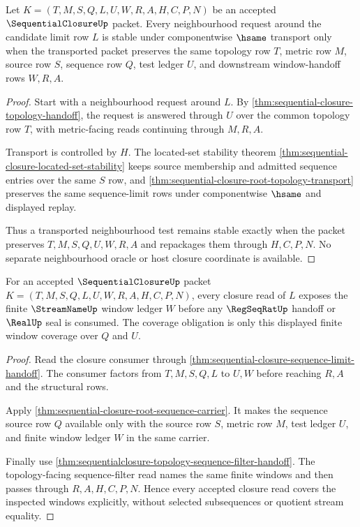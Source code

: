 \begin{theorem}
\label{thm:sequentialclosure-neighbourhood-test-stability}
Let $K=(T,M,S,Q,L,U,W,R,A,H,C,P,N)$ be an accepted $\SequentialClosureUp$ packet. Every neighbourhood request around the candidate limit row $L$ is stable under componentwise $\hsame$ transport only when the transported packet preserves the same topology row $T$, metric row $M$, source row $S$, sequence row $Q$, test ledger $U$, and downstream window-handoff rows $W,R,A$.
\end{theorem}
\begin{proof}
Start with a neighbourhood request around $L$. By \autoref{thm:sequential-closure-topology-handoff}, the request is answered through $U$ over the common topology row $T$, with metric-facing reads continuing through $M,R,A$.

Transport is controlled by $H$. The located-set stability theorem \autoref{thm:sequential-closure-located-set-stability} keeps source membership and admitted sequence entries over the same $S$ row, and \autoref{thm:sequential-closure-root-topology-transport} preserves the same sequence-limit rows under componentwise $\hsame$ and displayed replay.

Thus a transported neighbourhood test remains stable exactly when the packet preserves $T,M,S,Q,U,W,R,A$ and repackages them through $H,C,P,N$. No separate neighbourhood oracle or host closure coordinate is available.
\end{proof}

\begin{theorem}
\label{thm:sequentialclosure-sequence-window-coverage}
For an accepted $\SequentialClosureUp$ packet $K=(T,M,S,Q,L,U,W,R,A,H,C,P,N)$, every closure read of $L$ exposes the finite $\StreamNameUp$ window ledger $W$ before any $\RegSeqRatUp$ handoff or $\RealUp$ seal is consumed. The coverage obligation is only this displayed finite window coverage over $Q$ and $U$.
\end{theorem}
\begin{proof}
Read the closure consumer through \autoref{thm:sequential-closure-sequence-limit-handoff}. The consumer factors from $T,M,S,Q,L$ to $U,W$ before reaching $R,A$ and the structural rows.

Apply \autoref{thm:sequential-closure-root-sequence-carrier}. It makes the sequence source row $Q$ available only with the source row $S$, metric row $M$, test ledger $U$, and finite window ledger $W$ in the same carrier.

Finally use \autoref{thm:sequentialclosure-topology-sequence-filter-handoff}. The topology-facing sequence-filter read names the same finite windows and then passes through $R,A,H,C,P,N$. Hence every accepted closure read covers the inspected windows explicitly, without selected subsequences or quotient stream equality.
\end{proof}


